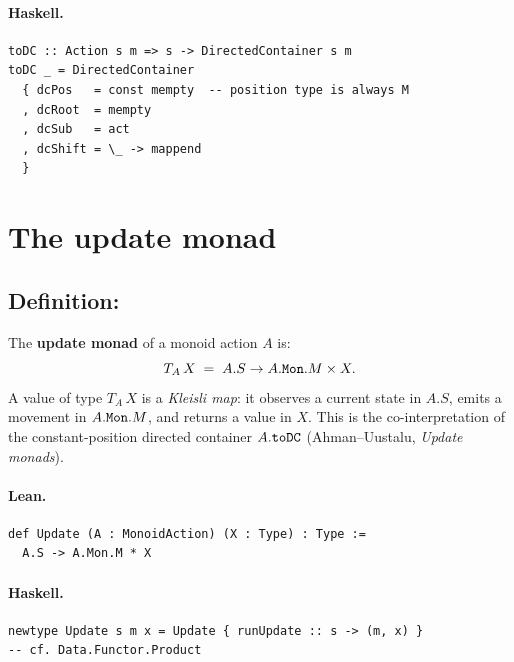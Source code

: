 \documentclass[11pt,a4paper]{article}
\begin{document}
\paragraph{Haskell.}
\begin{lstlisting}[style=haskell]
toDC :: Action s m => s -> DirectedContainer s m
toDC _ = DirectedContainer
  { dcPos   = const mempty  -- position type is always M
  , dcRoot  = mempty
  , dcSub   = act
  , dcShift = \_ -> mappend
  }
\end{lstlisting}


\section{The update monad}

\subsection{Definition: }

\begin{defn}
The \textbf{update monad} of a monoid action $A$ is:
\[
  T_A\, X \;=\; A.S \to A.\texttt{Mon}.M \times X.
\]
A value of type $T_A\, X$ is a \emph{Kleisli map}: it observes a current
state in $A.S$, emits a movement in $A.\texttt{Mon}.M$, and returns a value
in $X$.  This is the co-interpretation of the constant-position directed
container $A.\texttt{toDC}$ (Ahman--Uustalu, \emph{Update monads}).
\end{defn}

\paragraph{Lean.}
\begin{lstlisting}[style=lean]
def Update (A : MonoidAction) (X : Type) : Type :=
  A.S -> A.Mon.M * X
\end{lstlisting}

\paragraph{Haskell.}
\begin{lstlisting}[style=haskell]
newtype Update s m x = Update { runUpdate :: s -> (m, x) }
-- cf. Data.Functor.Product
\end{lstlisting}
\end{document}
